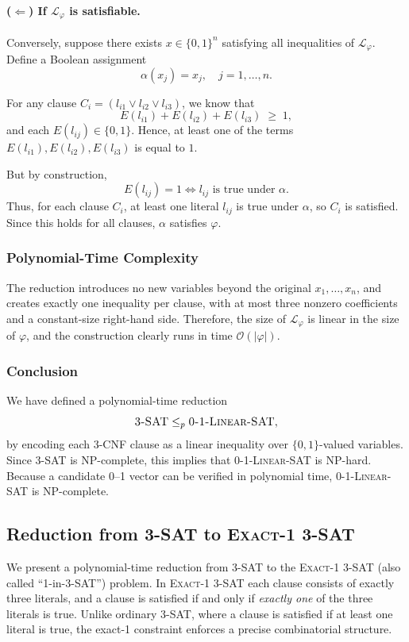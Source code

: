 \documentclass[9pt]{extarticle}
\begin{document}
\paragraph{($\Leftarrow$) If $\mathcal{L}_\varphi$ is satisfiable.}

Conversely, suppose there exists $x \in \{0,1\}^n$ satisfying all inequalities
of $\mathcal{L}_\varphi$.  Define a Boolean assignment
\[
\alpha(x_j) = x_j, \quad j = 1,\dots,n.
\]

For any clause $C_i = (l_{i1} \lor l_{i2} \lor l_{i3})$, we know that
\[
E(l_{i1}) + E(l_{i2}) + E(l_{i3}) \;\ge\; 1,
\]
and each $E(l_{ij}) \in \{0,1\}$.  Hence, at least one of the terms
$E(l_{i1}), E(l_{i2}), E(l_{i3})$ is equal to $1$.

But by construction,
\[
E(l_{ij}) = 1 \iff l_{ij} \text{ is true under } \alpha.
\]
Thus, for each clause $C_i$, at least one literal $l_{ij}$ is true under
$\alpha$, so $C_i$ is satisfied.  Since this holds for all clauses, $\alpha$
satisfies $\varphi$.

\subsubsection*{Polynomial-Time Complexity}

The reduction introduces no new variables beyond the original $x_1,\dots,x_n$,
and creates exactly one inequality per clause, with at most three nonzero
coefficients and a constant-size right-hand side.  Therefore, the size of
$\mathcal{L}_\varphi$ is linear in the size of $\varphi$, and the construction
clearly runs in time $\mathcal{O}(|\varphi|)$.

\subsubsection*{Conclusion}

We have defined a polynomial-time reduction
\[
    \textsc{3-SAT} \le_p \textsc{0-1-Linear-SAT},
\]
by encoding each 3-CNF clause as a linear inequality over $\{0,1\}$-valued
variables.  Since \textsc{3-SAT} is NP-complete, this implies that
\textsc{0-1-Linear-SAT} is NP-hard.  Because a candidate 0–1 vector can be
verified in polynomial time, \textsc{0-1-Linear-SAT} is NP-complete.
\subsection{Reduction from \textsc{3-SAT} to \textsc{Exact-1 3-SAT}}

We present a polynomial-time reduction from \textsc{3-SAT} to the
\textsc{Exact-1 3-SAT} (also called ``1-in-3-SAT'') problem.  In
\textsc{Exact-1 3-SAT} each clause consists of exactly three literals, and a
clause is satisfied if and only if \emph{exactly one} of the three literals is
true.  Unlike ordinary 3-SAT, where a clause is satisfied if at least one
literal is true, the exact-1 constraint enforces a precise combinatorial
structure.
\end{document}
